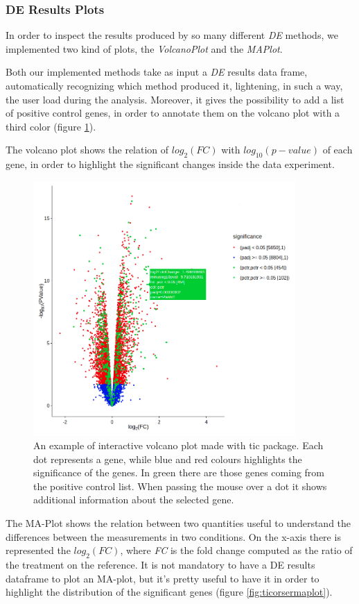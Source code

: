 \subsubsection{DE Results Plots}
In order to inspect the results produced by so many different \textit{DE} methods, we implemented two kind of plots, the \textit{VolcanoPlot} and the \textit{MAPlot}.

Both our implemented methods take as input a \textit{DE} results data frame, automatically recognizing which method produced it, lightening, in such a way, the user load during the analysis.
Moreover, it gives the possibility to add a list of positive control genes, in order to annotate them on the volcano plot with a third color (figure \ref{fig:ticorservolcano}).

The volcano plot shows the relation of $log_2(FC)$ with $log_{10}(p-value)$ of each gene, in order to highlight the significant changes inside the data experiment.

\begin{figure}[H]
\centering
\includegraphics[width=10cm, keepaspectratio]{img/ticorser/volcano_example.png}
\caption[ticorser volcano]{An example of interactive volcano plot made with \gls{tic} package. Each dot represents a gene, while blue and red colours highlights the significance of the genes. In green there are those genes coming from the positive control list. When passing the mouse over a dot it shows additional information about the selected gene.}
\label{fig:ticorservolcano}
\end{figure}

The MA-Plot shows the relation between two quantities useful to understand the differences between the measurements in two conditions.
On the x-axis there is represented the $log_2(FC)$, where \textit{FC} is the fold change computed as the ratio of the treatment on the reference.
It is not mandatory to have a DE results dataframe to plot an MA-plot, but it's pretty useful to have it in order to highlight the distribution of the significant genes (figure \ref{fig:ticorsermaplot}).
 
